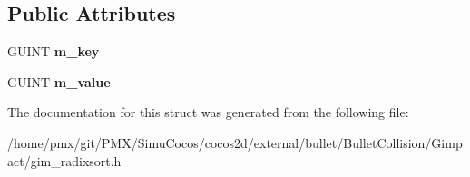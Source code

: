 \subsection*{Public Attributes}
\begin{DoxyCompactItemize}
\item 
\mbox{\label{structGIM__RSORT__TOKEN_a86c043951bfaad74e57bffadb64b8d30}} 
G\+U\+I\+NT {\bfseries m\+\_\+key}
\item 
\mbox{\label{structGIM__RSORT__TOKEN_aca09acfff366734f7529fb9cd082ba00}} 
G\+U\+I\+NT {\bfseries m\+\_\+value}
\end{DoxyCompactItemize}


The documentation for this struct was generated from the following file\+:\begin{DoxyCompactItemize}
\item 
/home/pmx/git/\+P\+M\+X/\+Simu\+Cocos/cocos2d/external/bullet/\+Bullet\+Collision/\+Gimpact/gim\+\_\+radixsort.\+h\end{DoxyCompactItemize}

